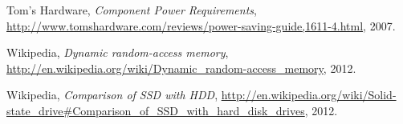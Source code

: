 \documentclass[a4paper,final]{article}
\begin{document}
\begin{thebibliography}{9}
    Tom's Hardware,
    \emph{Component Power Requirements},
    \url{http://www.tomshardware.com/reviews/power-saving-guide,1611-4.html},
    2007.

    Wikipedia,
    \emph{Dynamic random-access memory},
    \url{http://en.wikipedia.org/wiki/Dynamic_random-access_memory},
    2012.

    Wikipedia,
    \emph{Comparison of SSD with HDD},
    \url{http://en.wikipedia.org/wiki/Solid-state_drive#Comparison_of_SSD_with_hard_disk_drives},
    2012.
\end{thebibliography}
\end{document}

